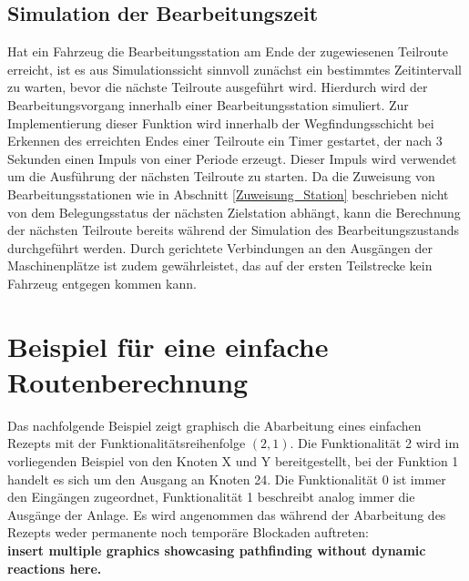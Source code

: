 		\subsection{Simulation der Bearbeitungszeit}
			\label{Simulation Station}
			Hat ein Fahrzeug die Bearbeitungsstation am Ende der zugewiesenen Teilroute erreicht, ist es aus Simulationssicht sinnvoll zunächst ein bestimmtes Zeitintervall zu warten, bevor die nächste Teilroute ausgeführt wird. Hierdurch wird der Bearbeitungsvorgang innerhalb einer Bearbeitungsstation simuliert. Zur Implementierung dieser Funktion wird innerhalb der Wegfindungsschicht bei Erkennen des erreichten Endes einer Teilroute ein Timer gestartet, der nach 3 Sekunden einen Impuls von einer Periode erzeugt. Dieser Impuls wird verwendet um die Ausführung der nächsten Teilroute zu starten. Da die Zuweisung von Bearbeitungsstationen wie in Abschnitt \ref{Zuweisung_Station} beschrieben nicht von dem Belegungsstatus der nächsten Zielstation abhängt, kann die Berechnung der nächsten Teilroute bereits während der Simulation des Bearbeitungszustands durchgeführt werden. Durch gerichtete Verbindungen an den Ausgängen der Maschinenplätze ist zudem gewährleistet, das auf der ersten Teilstrecke kein Fahrzeug entgegen kommen kann.
	
		
	\section{Beispiel für eine einfache Routenberechnung}
	
		Das nachfolgende Beispiel zeigt graphisch die Abarbeitung eines einfachen Rezepts mit der Funktionalitätsreihenfolge $(2,1)$. Die Funktionalität 2 wird im vorliegenden Beispiel von den Knoten X und Y bereitgestellt, bei der Funktion 1 handelt es sich um den Ausgang an Knoten 24. Die Funktionalität 0 ist immer den Eingängen zugeordnet, Funktionalität 1 beschreibt analog immer die Ausgänge der Anlage. Es wird angenommen das während der Abarbeitung des Rezepts weder permanente noch temporäre Blockaden auftreten:\\
		\textbf{insert multiple graphics showcasing pathfinding without dynamic reactions here.}
